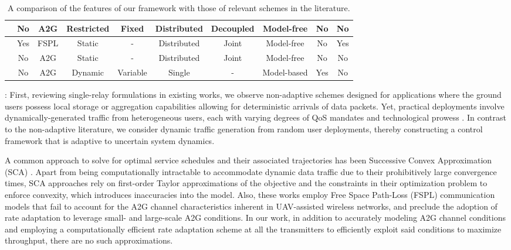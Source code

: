 \documentclass[10pt, twocolumn]{IEEEtran}
\theoremstyle{plain}
\theoremstyle{definition}
\theoremstyle{remark}
\begin{document}
\begin{table}
\begin{center}
\begin{tabular}{|*{10}{c|}}
    \hline
    \cite{RLSenseSend} & No & A2G & Restricted & Fixed & Distributed & Decoupled & Model-free & No & No\\
    \hline
    \cite{DQNPositioning} & Yes & FSPL & Static & - & Distributed & Joint & Model-free & No & Yes\\
    \hline
    \cite{MLDeployment} & No & A2G & Static & - & Distributed & Joint & Model-free & No & No\\
    \hline
    \cite{Rician} & No & A2G & Dynamic & Variable & Single & - & Model-based & Yes & No\\
    \hline
    \end{tabular}
    \caption{A comparison of the features of our framework with those of relevant schemes in the literature.}\label{T1}
\end{center}
\vspace{-8mm}
\end{table}

: First, reviewing single-relay formulations in existing works, we observe non-adaptive schemes \cite{SCA, PAoI, MEC-CVX, LoSMap, Rician} designed for applications where the ground users possess local storage or aggregation capabilities allowing for deterministic arrivals of data packets. Yet, practical deployments involve dynamically-generated traffic from heterogeneous users, each with varying degrees of QoS mandates and technological prowess \cite{UAVSurvey, UAVTutorial}. In contrast to the non-adaptive literature, we consider dynamic traffic generation from random user deployments, thereby constructing a control framework that is adaptive to uncertain system dynamics.

A common approach to solve for optimal service schedules and their associated trajectories has been Successive Convex Approximation (SCA) \cite{SCA, PAoI, MEC-CVX, Rician}. Apart from being computationally intractable to accommodate dynamic data traffic due to their prohibitively large convergence times, SCA approaches rely on first-order Taylor approximations of the objective and the constraints in their optimization problem to enforce convexity, which introduces inaccuracies into the model. Also, these works employ Free Space Path-Loss (FSPL) communication models that fail to account for the A2G channel characteristics inherent in UAV-assisted wireless networks, and preclude the adoption of rate adaptation to leverage small- and large-scale A2G conditions. In our work, in addition to accurately modeling A2G channel conditions and employing a computationally efficient rate adaptation scheme at all the transmitters to efficiently exploit said conditions to maximize throughput, there are no such approximations.
\end{document}
